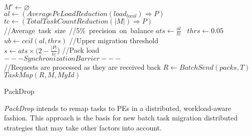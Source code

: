 \begin{algorithm}
	\DontPrintSemicolon
    $  M' \gets \varnothing$\\
    $al \gets (AveragePeLoadReduction(load_{local})\Rightarrow  P)$ \\
    $tc \gets (TotalTaskCountReduction(| M|)\Rightarrow  P)$\\
    //Average~task~size~\quad//5\%~precision~on~balance\qquad
    $ats\gets \frac{al}{tc}$ \qquad\qquad\  $thrs \gets 0.05$\\
    $ub \gets ceil(al,thrs)$ \qquad //Upper migration threshold\\
    $s \gets ats\times (2-\frac{|  P|}{tc}$) \qquad\qquad //Pack load\\
    $---Synchronization Barrier---$\\
    //Requests are processed as they are received back
    $R \gets BatchSend(packs, T)$\\
    $TaskMap(R,   M, MyId)$
    \caption{PackDrop}
    \label{algo:packdrop}    
\end{algorithm}

\textit{PackDrop} intends to remap tasks to PEs in a distributed, workload-aware fashion.
This approach is the basis for new batch task migration distributed strategies that may take other factors into account.

